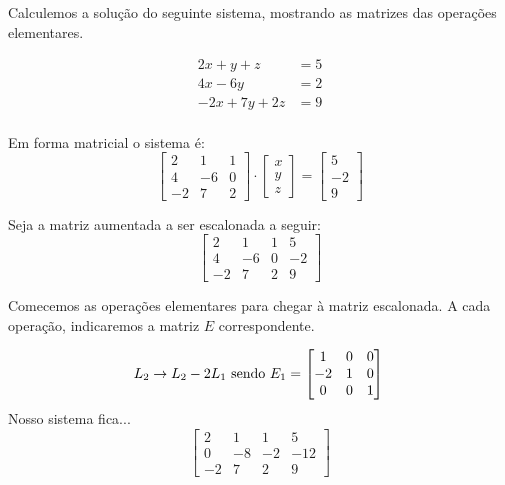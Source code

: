 \documentclass[12pt]{article}
\begin{document}
Calculemos a solução do seguinte sistema, mostrando as matrizes das operações elementares.

\begin{align*}
	2x+y+z&=5\\4x-6y&=2\\-2x+7y+2z&=9
\end{align*}\\

Em forma matricial o sistema é: \\

\begin{equation*}
	\begin{bmatrix}
		2 & 1 & 1\\
		4 & -6 & 0\\
		-2 & 7 & 2
	\end{bmatrix} \cdot
	\begin{bmatrix}
		x\\ y\\z
	\end{bmatrix} =
	\begin{bmatrix}
		5 \\ -2\\9
	\end{bmatrix}
\end{equation*}


Seja a matriz aumentada a ser escalonada a seguir: 
\begin{equation*}
	\begin{bmatrix}
		2 & 1 & 1 & 5\\
		4 & -6 & 0 & -2\\
		-2 & 7 & 2 & 9
	\end{bmatrix}
\end{equation*}

Comecemos as operações elementares para chegar à matriz escalonada. A cada operação, indicaremos a matriz $E$ correspondente.

\begin{equation*}
	L_2 \rightarrow L_2 -2L_1 \mbox{ sendo } 
	E_1=\begin{bmatrix}
		1 & 0 &0\\
		-2 & 1 & 0\\
		0 & 0 & 1
	\end{bmatrix}\\
\end{equation*}
Nosso sistema fica...
\begin{equation*}
	\begin{bmatrix}
		2 & 1 & 1 & 5\\
		0 & -8 & -2 & -12\\
		-2 & 7 & 2 & 9
	\end{bmatrix}
\end{equation*}\\
\end{document}
